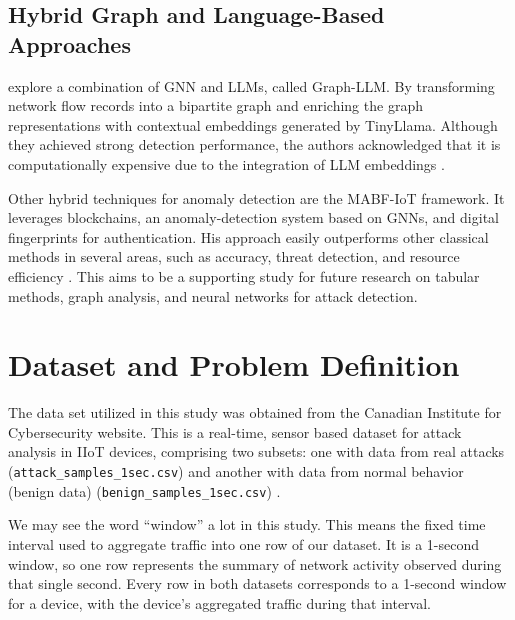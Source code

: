 \documentclass[final,5p,times,twocolumn]{elsarticle}
\begin{document}
\subsection{Hybrid Graph and Language-Based Approaches}
\cite{hwang2026cgllm} explore a combination of GNN and LLMs, called Graph-LLM. By transforming network flow records into a bipartite graph and enriching the graph representations with contextual embeddings generated by TinyLlama. Although they achieved strong detection performance, the authors acknowledged that it is computationally expensive due to the integration of LLM embeddings \citep{hwang2026cgllm}.

Other hybrid techniques for anomaly detection are the MABF-IoT framework. It leverages blockchains, an anomaly-detection system based on GNNs, and digital fingerprints for authentication. His approach easily outperforms other classical methods in several areas, such as accuracy, threat detection, and resource efficiency \citep{jhariya_secure_2026}. This aims to be a supporting study for future research on tabular methods, graph analysis, and neural networks for attack detection.

\section{Dataset and Problem Definition}
\label{sec:dataset_problem_definition}

The data set utilized in this study was obtained from the Canadian Institute for Cybersecurity website. This is a real-time, sensor based dataset for attack analysis in IIoT devices, comprising two subsets: one with data from real attacks (\texttt{attack\_samples\_1sec.csv}) and another with data from normal behavior (benign data) (\texttt{benign\_samples\_1sec.csv}) \citep{unb_iiot_2025}. 

We may see the word ``window'' a lot in this study. This means the fixed time interval used to aggregate traffic into one row of our dataset. It is a 1-second window, so one row represents the summary of network activity observed during that single second. Every row in both datasets corresponds to a 1-second window for a device, with the device's aggregated traffic during that interval.
\end{document}
